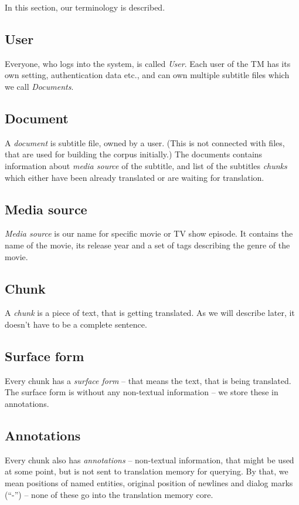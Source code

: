\label{sec:glossary}

In this section, our terminology is described.

\subsection*{User}
Everyone, who logs into the system, is called \emph{User}. Each user of the TM has its own setting, authentication data etc., and can own multiple subtitle files which we call \emph{Documents}.

\subsection*{Document}
A \emph{document} is subtitle file, owned by a user. (This is not connected with files, that are used for building the corpus initially.) The documents contains information about \emph{media source} of the subtitle, and list of the subtitles \emph{chunks} which either have been already translated or are waiting for translation.

\subsection*{Media source}
\emph{Media source} is our name for specific movie or TV show episode. It contains the name of the movie, its release year and a set of tags describing the genre of the movie.

\subsection*{Chunk}
A \emph{chunk} is a piece of text, that is getting translated. As we will describe later, it doesn't have to be a complete sentence.

\subsection*{Surface form}
Every chunk has a \emph{surface form} -- that means the text, that is being translated. The surface form is without any non-textual information -- we store these in annotations.

\subsection*{Annotations}
Every chunk also has \emph{annotations} -- non-textual information, that might be used at some point, but is not sent to translation memory for querying. By that, we mean positions of named entities, original position of newlines and dialog marks (``-'') -- none of these go into the translation memory core.

